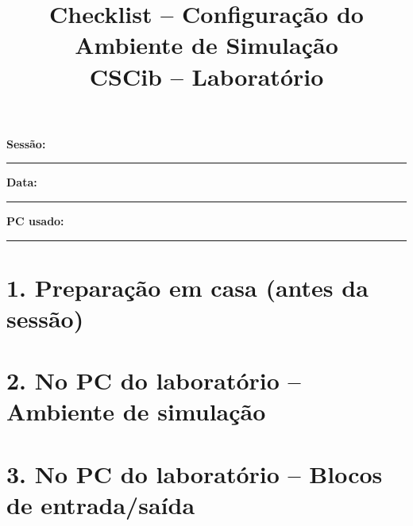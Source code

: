 \documentclass[11pt,a4paper]{article}
\title{Checklist -- Configura\c{c}\~ao do Ambiente de Simula\c{c}\~ao\\\large CSCib -- Laborat\'orio}
\author{}
\date{}
\begin{document}
\maketitle
\vspace{-2em}

\noindent
\textbf{Sess\~ao:} \rule{3cm}{0.4pt} \hfill
\textbf{Data:} \rule{3cm}{0.4pt} \hfill
\textbf{PC usado:} \rule{3cm}{0.4pt}

\vspace{1.5em}

\section*{1. Prepara\c{c}\~ao em casa (antes da sess\~ao)}
\begin{checklist}
	\item
	\item
	\item
	\item
\end{checklist}

\section*{2. No PC do laborat\'orio -- Ambiente de simula\c{c}\~ao}
\begin{checklist}
	\item
	\item
	\item
\end{checklist}

\section*{3. No PC do laborat\'orio -- Blocos de entrada/sa\'ida}
\begin{checklist}
	\item
	\item
	\item
	\item
\end{checklist}
\end{document}
